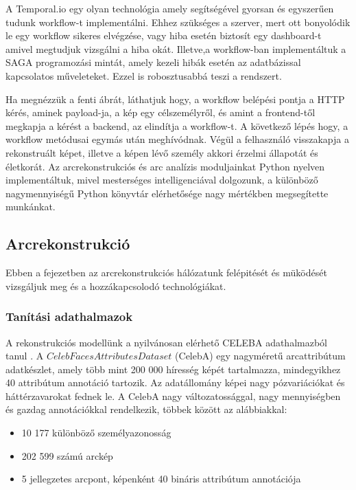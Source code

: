 \documentclass[12pt,a4]{article}
\begin{document}
	A Temporal.io egy olyan technológia amely segítségével gyorsan és
	egyszerűen tudunk workflow-t implementálni. Ehhez szükséges a szerver,
	mert ott bonyolódik le egy workflow sikeres elvégzése, vagy hiba esetén
	biztosít egy dashboard-t amivel megtudjuk vizsgálni a hiba okát. Illetve,a
	workflow-ban implementáltuk a SAGA programozási mintát, amely kezeli
	hibák esetén az adatbázissal kapcsolatos műveleteket. Ezzel is robosztusabbá
	teszi a rendszert.
	
	Ha megnézzük a fenti ábrát, láthatjuk hogy, a workflow belépési pontja a HTTP kérés, aminek payload-ja, a kép egy célszemélyről, és amint a
	frontend-től megkapja a kérést a backend, az elindítja a workflow-t. A következő lépés hogy, a workflow metódusai egymás után meghívódnak.
	Végül a felhasználó visszakapja a rekonstruált képet, illetve a képen lévő személy akkori érzelmi állapotát és életkorát. Az arcrekonstrukciós és arc
	analízis moduljainkat Python nyelven implementáltuk, mivel mesterséges intelligenciával dolgozunk, a különböző nagymennyiségű Python könyvtár
	elérhetősége nagy mértékben megsegítette munkánkat.
	
	
	\newpage
    \subsection{Arcrekonstrukció}

    Ebben a fejezetben az arcrekonstrukciós hálózatunk felépitését és müködését vizsgáljuk meg és a hozzákapcsolodó technológiákat.

    \subsubsection{Tanítási adathalmazok}
	A rekonstrukciós modellünk a nyilvánosan elérhető CELEBA adathalmazból tanul \cite{celeba}. A $CelebFaces Attributes Dataset$ (CelebA) egy nagyméretű arcattribútum adatkészlet, amely több mint 200 000 híresség képét tartalmazza, mindegyikhez 40 attribútum annotáció tartozik. Az adatállomány képei nagy pózvariációkat és háttérzavarokat fednek le. A CelebA nagy változatossággal, nagy mennyiségben és gazdag annotációkkal rendelkezik, többek között az alábbiakkal:

    \begin{itemize}
        \item 10 177 különböző személyazonosság
        \item 202 599 számú arckép
        \item 5 jellegzetes arcpont, képenként 40 bináris attribútum annotációja
    \end{itemize}
\end{document}
